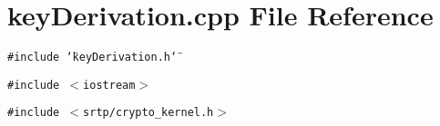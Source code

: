 \section{key\-Derivation.cpp File Reference}
\label{keyDerivation_8cpp}
{\tt \#include \char`\"{}key\-Derivation.h\char`\"{}}\par
{\tt \#include $<$iostream$>$}\par
{\tt \#include $<$srtp/crypto\_\-kernel.h$>$}\par
